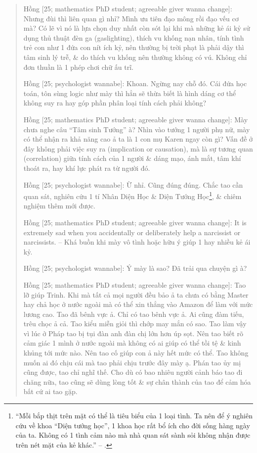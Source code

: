 \documentclass[12pt,twoside]{book}
\begin{document}
\begin{quote}
	{\sf Hồng [25; mathematics PhD student; agreeable giver wanna change]}: Nhưng đùi thì liên quan gì nhỉ? Mình ưu tiên đạo mông rồi đạo vếu cơ mà? Có lẽ vì nó là lựa chọn duy nhất còn sót lại khi mà những kẻ ái kỷ sử dụng thủ thuật đèn ga (gaslighting), thích vu khống nạn nhân, tính tình trẻ con như 1 đứa con nít ích kỷ, nên thường bị trời phạt là phải dậy thì tâm sinh lý trễ, \& do thích vu khống nên thường không có vú. Không chỉ đơn thuần là 1 phép chơi chữ ấu trĩ.
	
	{\sf Hồng [25; psychologist wannabe]}: Khoan. Ngừng nay chỗ đó. Cái đứa học toán, tôn sùng logic như mày thì hẳn sẽ thừa biết là hình dáng cơ thể không suy ra hay góp phần phân loại tính cách phải không?
	
	{\sf Hồng [25; mathematics PhD student; agreeable giver wanna change]}: Mày chưa nghe câu ``Tâm sinh Tướng'' à? Nhìn vào tướng 1 người phụ nữ, mày có thể nhận ra khả năng cao ả ta là 1 con mụ Karen ngay còn gì? Vấn đề ở đây không phải việc suy ra (implication or causation), mà là sự tương quan (correlation) giữa tính cách của 1 người \& dáng mạo, ánh mắt, tâm khí thoát ra, hay khí lực phát ra từ người đó.
	
	{\sf Hồng [25; psychologist wannabe]}: Ừ nhỉ. Cũng đúng đúng. Chắc tao cần quan sát, nghiên cứu 1 tí Nhân Diện Học \& Diện Tướng Học\footnote{``Mỗi bắp thịt trên mặt có thể là tiêu biểu của 1 loại tình. Ta nên để ý nghiên cứu về khoa ``Diện tướng học'', 1 khoa học rất bổ ích cho đời sống hàng ngày của ta. Không có 1 tình cảm nào mà nhà quan sát sành sỏi không nhận được trên nét mặt của kẻ khác.'' -- \cite[Chap. 1: {\it Thuật Quan Sát}, p. 39]{Can_oc_sang_suot}.}, \& chiêm nghiệm thêm mới được.
	
	{\sf Hồng [25; mathematics PhD student; agreeable giver wanna change]}: It is extremely sad when you accidentally or deliberately help a narcissist or narcissists. -- Khá buồn khi mày vô tình hoặc hữu ý giúp 1 hay nhiều kẻ ái kỷ.
	
	{\sf Hồng [25; psychologist wannabe]}: Ý mày là sao? Đã trải qua chuyện gì à?
	
	{\sf Hồng [25; mathematics PhD student; agreeable giver wanna change]}: Tao lỡ giúp Trinh. Khi mà tất cả mọi người đều bảo ả ta chưa có bằng Master hay chả học ở nước ngoài mà có thể xin thẳng vào Amazon để làm với mức lương cao. Tao đã bênh vực ả. Chỉ có tao bênh vực ả. Ai cũng đàm tiếu, trêu chọc ả cả. Tao kiểu miễn giỏi thì chớp may mắn có sao. Tao làm vậy vì lúc ở Pháp tao bị tụi đàn anh đàn chị lớn hơn úp sọt. Nên tao biết rõ cảm giác 1 mình ở nước ngoài mà không có ai giúp có thể tồi tệ \& kinh khủng tới mức nào. Nên tao cố giúp con ả này hết mức có  thể. Tao không muốn ai đó chịu cái mà tao phải chịu trước đây mày ạ. Phán tao ủy mị cũng được, tao chỉ nghĩ thế. Cho dù có bao nhiêu người cảnh báo tao đi chăng nữa, tao cũng sẽ dùng lòng tốt \& sự chân thành của tao để cảm hóa bất cứ ai tao gặp.
	

\end{quote}
\end{document}
